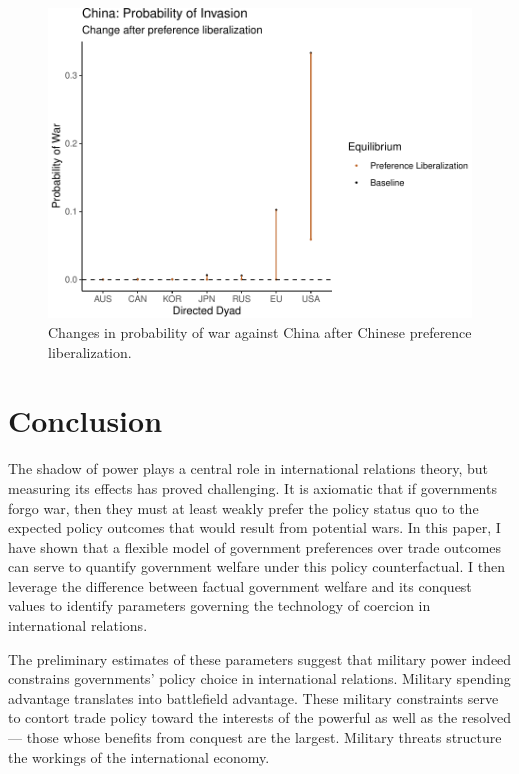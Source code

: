 \documentclass{puthesis}
\begin{document}
\begin{figure}
\centering
\includegraphics{figure/war_probs_pp4-1.pdf}
\caption{Changes in probability of war against China after Chinese
preference liberalization. \label{fig:war_probs_pp4}}
\end{figure}

\section{Conclusion}

The shadow of power plays a central role in international relations
theory, but measuring its effects has proved challenging. It is
axiomatic that if governments forgo war, then they must at least weakly
prefer the policy status quo to the expected policy outcomes that would
result from potential wars. In this paper, I have shown that a flexible
model of government preferences over trade outcomes can serve to
quantify government welfare under this policy counterfactual. I then
leverage the difference between factual government welfare and its
conquest values to identify parameters governing the technology of
coercion in international relations.

The preliminary estimates of these parameters suggest that military
power indeed constrains governments' policy choice in international
relations. Military spending advantage translates into battlefield
advantage. These military constraints serve to contort trade policy
toward the interests of the powerful as well as the resolved --- those
whose benefits from conquest are the largest. Military threats structure
the workings of the international economy.
\end{document}
